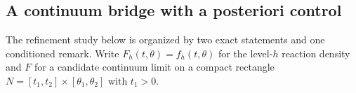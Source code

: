 

\subsection{A continuum bridge with a posteriori control}
\label{sec:bridge-theory}

The refinement study below is organized by two exact statements and one
conditioned remark. Write \(F_h(t,\theta)=f_h(t,\theta)\) for the level-\(h\)
reaction density and \(F\) for a candidate continuum limit on a compact
rectangle \(N=[t_1,t_2]\times[\theta_1,\theta_2]\) with \(t_1>0\).

